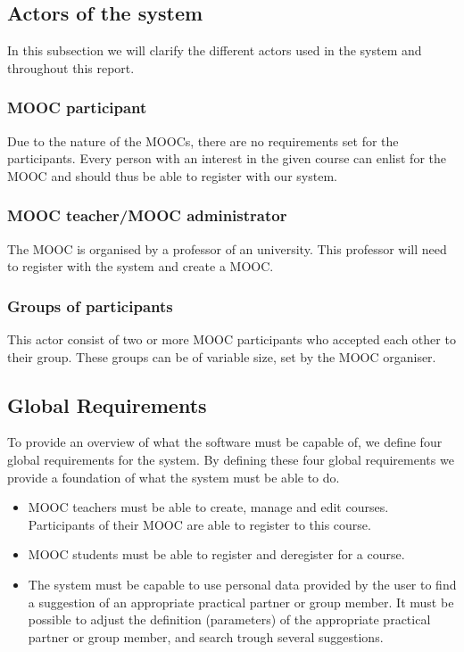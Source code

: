 \documentclass[]{article}
\begin{document}
\subsection{Actors of the system}
In this subsection we will clarify the different actors used in the system and throughout this report.
\subsubsection{MOOC participant}
Due to the nature of the MOOCs, there are no requirements set for the participants.
Every person with an interest in the given course can enlist for the MOOC and should thus be able to register with our system.
\subsubsection{MOOC teacher/MOOC administrator} 
The MOOC is organised by a professor of an university.
This professor will need to register with the system and create a MOOC.
\subsubsection{Groups of participants}
This actor consist of two or more MOOC participants who accepted each other to their group.
These groups can be of variable size, set by the MOOC organiser.

\subsection{Global Requirements}
To provide an overview of what the software must be capable of, we define four global requirements for the system.
By defining these four global requirements we provide a foundation of what the system must be able to do.
\begin{itemize}
\item  MOOC teachers must be able to create, manage and edit courses.
Participants of their MOOC are able to register to this course.

\item MOOC students must be able to register and deregister for a course.

\item The system must be capable to use personal data provided by the user to find a suggestion of an appropriate practical partner or group member.
It must be possible to adjust the definition (parameters) of the appropriate practical partner or group member, and search trough several suggestions.
\end{itemize}
\end{document}

